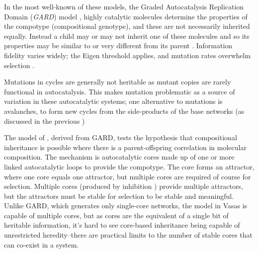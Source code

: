 
In the most well-known of these models, the Graded Autocatalysis Replication Domain (\emph{GARD}) model \parencite{Segre1998}, highly catalytic molecules determine the properties of the compotype (compositional genotype), and these are not necessarily inherited equally. Instead a child may or may not inherit one of these molecules and so its properties may be similar to or very different from its parent \parencite{Vasas2015, Vasas2012, Vasas2012a}. Information fidelity varies widely; the Eigen threshold \parencite{Eigen1971} applies, and mutation rates overwhelm selection \parencite{Vasas2015, Vasas2012, Vasas2012a}.

Mutations in cycles \parencite{Vasas2012a} are generally not heritable as mutant copies are rarely functional in autocatalysis. This makes mutation problematic as a source of variation in these autocatalytic systems; one alternative to mutations is avalanches, to form new cycles from the side-products of the base networks (as discussed in the previous )


The model of \cite{Vasas2015, Vasas2012, Vasas2012a}, derived from GARD, tests the hypothesis that compositional inheritance is possible where there is a parent-offspring correlation in molecular composition. The mechanism is autocatalytic cores made up of one or more linked autocatalytic loops to provide the compotype. The core forms an attractor, where one core equals one attractor, but multiple cores are required of course for selection. Multiple cores (produced by inhibition \textcite{Vasas2012a}) provide multiple attractors, but the attractors must be stable for selection to be stable and meaningful. Unlike GARD, which generates only single-core networks, the model in Vasas is capable of multiple cores, but as cores are the equivalent of a single bit of heritable information, it's hard to see core-based inheritance being capable of unrestricted heredity--there are practical limits to the number of stable cores that can co-exist in a system. 

